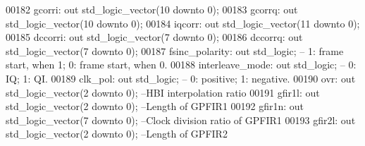 \begin{DoxyCode}
00182         gcorri: \textcolor{keywordflow}{out} \textcolor{comment}{std\_logic\_vector}(\textcolor{vhdllogic}{}\textcolor{vhdllogic}{10} \textcolor{keywordflow}{downto} \textcolor{vhdllogic}{}\textcolor{vhdllogic}{0});
00183         gcorrq: \textcolor{keywordflow}{out} \textcolor{comment}{std\_logic\_vector}(\textcolor{vhdllogic}{}\textcolor{vhdllogic}{10} \textcolor{keywordflow}{downto} \textcolor{vhdllogic}{}\textcolor{vhdllogic}{0});
00184         iqcorr: \textcolor{keywordflow}{out} \textcolor{comment}{std\_logic\_vector}(\textcolor{vhdllogic}{}\textcolor{vhdllogic}{11} \textcolor{keywordflow}{downto} \textcolor{vhdllogic}{}\textcolor{vhdllogic}{0});
00185         dccorri: \textcolor{keywordflow}{out} \textcolor{comment}{std\_logic\_vector}(\textcolor{vhdllogic}{}\textcolor{vhdllogic}{7} \textcolor{keywordflow}{downto} \textcolor{vhdllogic}{}\textcolor{vhdllogic}{0});
00186         dccorrq: \textcolor{keywordflow}{out} \textcolor{comment}{std\_logic\_vector}(\textcolor{vhdllogic}{}\textcolor{vhdllogic}{7} \textcolor{keywordflow}{downto} \textcolor{vhdllogic}{}\textcolor{vhdllogic}{0});
00187     fsinc\_polarity: \textcolor{keywordflow}{out} \textcolor{comment}{std\_logic};     \textcolor{keyword}{-- 1: frame start, when 1; 0: frame start, when 0.}
00188     interleave\_mode: \textcolor{keywordflow}{out} \textcolor{comment}{std\_logic};    \textcolor{keyword}{-- 0: IQ; 1: QI.}
00189     clk\_pol: \textcolor{keywordflow}{out} \textcolor{comment}{std\_logic};            \textcolor{keyword}{-- 0: positive; 1: negative.}
00190         ovr: \textcolor{keywordflow}{out} \textcolor{comment}{std\_logic\_vector}(\textcolor{vhdllogic}{}\textcolor{vhdllogic}{2} \textcolor{keywordflow}{downto} \textcolor{vhdllogic}{}\textcolor{vhdllogic}{0});  \textcolor{keyword}{--HBI interpolation ratio }
00191         gfir1l: \textcolor{keywordflow}{out} \textcolor{comment}{std\_logic\_vector}(\textcolor{vhdllogic}{}\textcolor{vhdllogic}{2} \textcolor{keywordflow}{downto} \textcolor{vhdllogic}{}\textcolor{vhdllogic}{0});       \textcolor{keyword}{--Length of GPFIR1}
00192         gfir1n: \textcolor{keywordflow}{out} \textcolor{comment}{std\_logic\_vector}(\textcolor{vhdllogic}{}\textcolor{vhdllogic}{7} \textcolor{keywordflow}{downto} \textcolor{vhdllogic}{}\textcolor{vhdllogic}{0});       \textcolor{keyword}{--Clock division ratio of GPFIR1}
00193         gfir2l: \textcolor{keywordflow}{out} \textcolor{comment}{std\_logic\_vector}(\textcolor{vhdllogic}{}\textcolor{vhdllogic}{2} \textcolor{keywordflow}{downto} \textcolor{vhdllogic}{}\textcolor{vhdllogic}{0});       \textcolor{keyword}{--Length of GPFIR2}

\end{DoxyCode}
